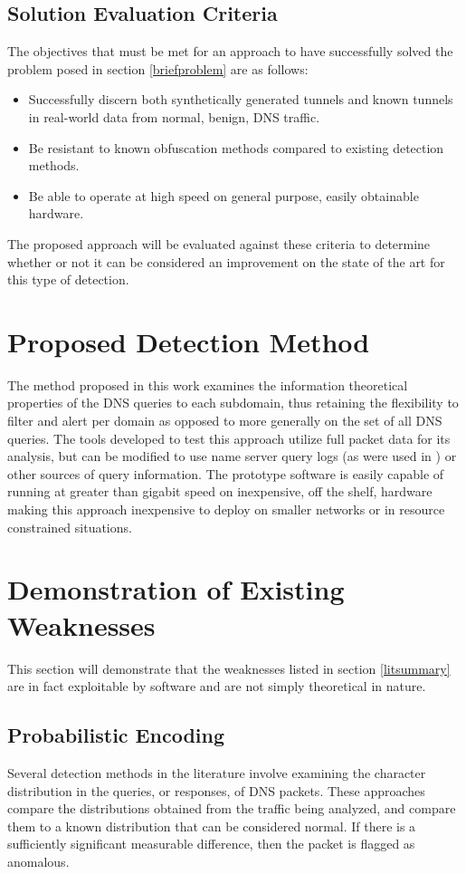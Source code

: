 \documentclass[12pt]{report}
\theoremstyle{remark}
\theoremstyle{definition}
\theoremstyle{definition}
\theoremstyle{definition}
\begin{document}
\section{Solution Evaluation Criteria}
The objectives that must be met for an approach to have successfully solved the problem posed in section \ref{briefproblem} are as follows:

\begin{itemize}
\item Successfully discern both synthetically generated tunnels and known tunnels
in real-world data from normal, benign, DNS traffic.
\item Be resistant to known obfuscation methods compared to existing detection
methods.
\item Be able to operate at high speed on general purpose, easily obtainable
hardware.
\end{itemize}

The proposed approach will be evaluated against these criteria to determine
whether or not it can be considered an improvement on the state of the art for
this type of detection.

\chapter{Proposed Detection Method}
\label{datameasurement}

The method proposed in this work examines the information theoretical properties of the
DNS queries to each subdomain, thus retaining the flexibility to filter and
alert per domain as opposed to more generally on the set of all DNS queries. The tools developed to test this approach utilize full packet data for its analysis, but can be modified to use name server query logs (as were used in \cite{Romana2007}) or other sources of query information. The prototype software is easily capable of running at greater than gigabit speed on inexpensive, off the shelf, hardware making this approach inexpensive to deploy on smaller networks or in resource constrained situations.

\chapter{Demonstration of Existing Weaknesses}
This section will demonstrate that the weaknesses listed in section \ref{litsummary} are in fact exploitable by software and are not simply theoretical in nature.

\section{Probabilistic Encoding}
\label{probencode}
Several detection methods in the literature involve examining the character distribution in the queries, or responses, of DNS packets. These approaches compare the distributions obtained from the traffic being analyzed, and compare them to a known distribution that can be considered normal. If there is a sufficiently significant measurable difference, then the packet is flagged as anomalous.
\end{document}
